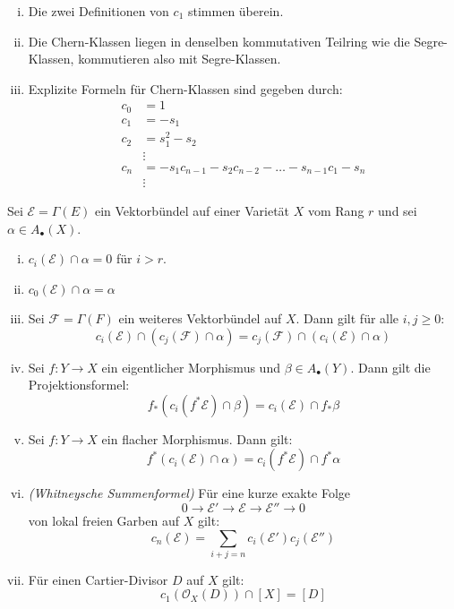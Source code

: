 \documentclass[10pt,a4paper]{article}
\begin{document}
\begin{remark}
\begin{enumerate}[(i)]
\item Die zwei Definitionen von $c_1$ stimmen überein.
\item Die Chern-Klassen liegen in denselben kommutativen Teilring wie die Segre-Klassen, kommutieren also mit Segre-Klassen.
\item Explizite Formeln für Chern-Klassen sind gegeben durch:
\begin{align*}
c_0 &= 1\\
c_1 &= -s_1\\
c_2 &= s_1^2 - s_2\\
&\vdots\\
c_n &= -s_1c_{n-1}-s_2c_{n-2}-\ldots -s_{n-1}c_1-s_n\\
&\vdots
\end{align*}
\end{enumerate}
\end{remark}

\begin{proposition}
Sei $\mathcal{E} = \Gamma(E)$ ein Vektorbündel auf einer Varietät $X$ vom Rang $r$ und sei $\alpha\in A_\bullet(X)$.
\begin{enumerate}[(i)]
\item $c_i(\mathcal{E})\cap \alpha = 0$ für $i > r$.
\item $c_0(\mathcal{E})\cap \alpha = \alpha$
\item Sei $\mathcal{F} = \Gamma(F)$ ein weiteres Vektorbündel auf $X$. Dann gilt für alle $i,j\geq 0$:
\[ c_i(\mathcal{E})\cap (c_j(\mathcal{F}) \cap \alpha) = c_j(\mathcal{F}) \cap (c_i(\mathcal{E})\cap \alpha) \]
\item Sei $f:Y\to X$ ein eigentlicher Morphismus und $\beta\in A_\bullet(Y)$. Dann gilt die Projektionsformel:
\[ f_\ast(c_i(f^\ast\mathcal{E})\cap\beta) = c_i(\mathcal{E})\cap f_\ast\beta \]
\item Sei $f:Y\to X$ ein flacher Morphismus. Dann gilt:
\[ f^\ast(c_i(\mathcal{E})\cap \alpha) = c_i(f^\ast\mathcal{E})\cap f^\ast\alpha \]
\item \textit{(Whitneysche Summenformel)} Für eine kurze exakte Folge 
\[ 0\longrightarrow\mathcal{E}'\longrightarrow\mathcal{E}\longrightarrow \mathcal{E}''\longrightarrow 0 \]
von lokal freien Garben auf $X$ gilt:
\[ c_n(\mathcal{E}) = \sum_{i+j = n}c_i(\mathcal{E}')c_j(\mathcal{E}'') \]
\item Für einen Cartier-Divisor $D$ auf $X$ gilt:
\[ c_1(\mathcal{O}_X(D))\cap [X] = [D] \]
\end{enumerate}
\end{proposition}
\end{document}
